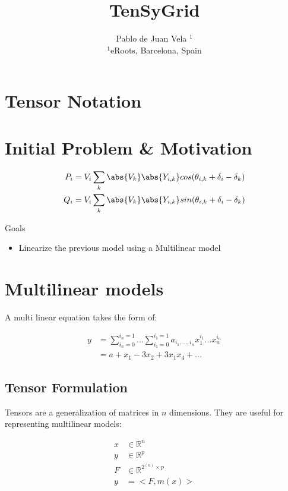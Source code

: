 \documentclass{article}
\title{TenSyGrid}
\author{Pablo de Juan Vela $^{1}$ \\
        \small $^{1}$eRoots, Barcelona, Spain \\
}
\date{}
\begin{document}
\maketitle
\begin{abstract} 
\end{abstract}

\section{Tensor Notation}

\section{Initial Problem \& Motivation}

\begin{align}
    P_i &= V_i \sum_k \abs{V_k} \abs{Y_{i,k}} cos(\theta_{i,k} +\delta_i -\delta_k) \\
    Q_i &= V_i \sum_k \abs{V_k} \abs{Y_{i,k}} sin(\theta_{i,k} +\delta_i -\delta_k) 
\end{align}

Goals
\begin{itemize}
    \item Linearize the previous model using a Multilinear model
\end{itemize}

\section{Multilinear models}

A multi linear equation takes the form of:

\begin{align}
    y &= \sum_{i_n = 0}^{i_n = 1}...\sum_{i_1 = 0}^{i_1 = 1} a_{i_1, ..., i_n} x_1^{i_1}...x_n^{i_n} \\
    &= a + x_1 - 3x_2 + 3x_1x_4 + ... 
\end{align}

\subsection{Tensor Formulation}

Tensors are a generalization of matrices in $n$ dimensions. They are useful for representing multilinear models:

\begin{align}
    x &\in \mathbb{R}^n \\
    y &\in \mathbb{R}^p \\
    F &\in \mathbb{R}^{2^{(n)} \times p} \\
    y &= <F, m(x)>
\end{align}
\end{document}
